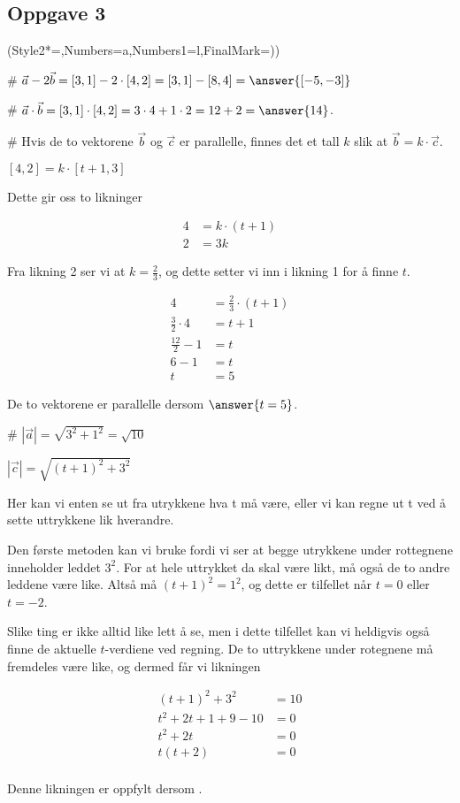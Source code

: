 \subsection*{Oppgave 3}
\begin{easylist}[enumerate]
	\ListProperties(Style2*=,Numbers=a,Numbers1=l,FinalMark={)})
	
	# $\vec{a} - 2\vec{b} = [3,1] - 2 \cdot [4,2] = [3,1] - [8,4] = \answer{[-5,-3]}$
	
	# $\vec{a} \cdot \vec{b} = [3,1] \cdot [4,2] = 3 \cdot 4 + 1 \cdot 2 = 12 + 2 = \answer{14}$.
	
	# Hvis de to vektorene $\vec{b}$ og $\vec{c}$ er parallelle, finnes det et tall $k$ slik at $\vec{b} = k \cdot \vec{c}$. 
	
	$[4,2]  = k \cdot [t+1,3]$
	
	Dette gir oss to likninger
	
	\begin{align*}
		4 & = k \cdot (t+1) \\
		2 & = 3k 
	\end{align*}
	
	Fra likning 2 ser vi at $k = \frac{2}{3}$, og dette setter vi inn i likning 1 for å finne $t$.
	
	\begin{align*}
		4 & = \frac{2}{3} \cdot (t+1) \\
		\frac{3}{2} \cdot 4 & = t+1 \\
		\frac{12}{2} -1 & = t \\
		6 - 1 & = t\\
		t & = 5
	\end{align*}
	
	De to vektorene er parallelle dersom $\answer{t = 5}$.
	
	# $|\vec{a}| = \sqrt{3^2 + 1^2} = \sqrt{10}$
	
	$|\vec{c}| = \sqrt{(t+1)^2 + 3^2}$
	
	Her kan vi enten se ut fra utrykkene hva t må være, eller vi kan regne ut t ved å sette uttrykkene lik hverandre. 
	
	Den første metoden kan vi bruke fordi vi ser at begge utrykkene under rottegnene inneholder leddet $3^2$. For at hele uttrykket da skal være likt, må også de to andre leddene være like. Altså må $(t+1)^2 = 1^2$, og dette er tilfellet når $t = 0$ eller $t=-2$. 
	
	Slike ting er ikke alltid like lett å se, men i dette tilfellet kan vi heldigvis også finne de aktuelle $t$-verdiene ved regning. De to uttrykkene under rotegnene må fremdeles være like, og dermed får vi likningen
	
	\begin{align*}
		(t+1)^2 + 3^2 &= 10 \\
		t^2 + 2t + 1 +9 - 10 & = 0 \\
		t^2 + 2t & = 0 \\
		t(t+2) & = 0 \\
	\end{align*}
	
	Denne likningen er oppfylt dersom .
\end{easylist}	


